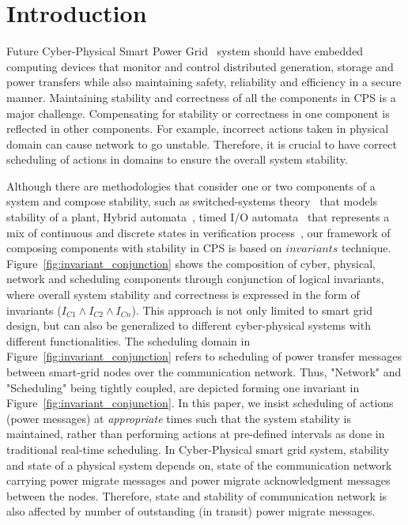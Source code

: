 \section{Introduction}
\label{sec:introduction}

Future Cyber-Physical Smart Power Grid~\cite{huang11} system should have embedded computing devices that monitor and control distributed generation, storage and power transfers while also maintaining safety, reliability and efficiency in a secure manner. Maintaining stability and correctness of all the components in CPS is a major challenge. Compensating for stability or correctness in one component is reflected in other components. For example, incorrect actions taken in physical domain can cause network to go unstable. Therefore, it is crucial to have correct scheduling of actions in domains to ensure the overall system stability.

Although there are methodologies that consider one or two components of a system and compose stability, such as switched-systems theory~\cite{donkers11} that models stability of a plant, Hybrid automata~\cite{henzinger96}, timed I/O automata~\cite{alur94} that represents a mix of continuous and discrete states in verification process~\cite{chutinan03,tomlin03}, our framework of composing components with stability in CPS is based on $invariants$ technique. Figure~\ref{fig:invariant_conjunction} shows the composition of cyber, physical, network and scheduling components through conjunction of logical invariants, where overall system stability and correctness is expressed in the form of invariants ($I_{C1} \wedge I_{C2} \wedge I_{Cn}$). This approach is not only limited to smart grid design, but can also be generalized to different cyber-physical systems with different functionalities. The scheduling domain in Figure~\ref{fig:invariant_conjunction} refers to scheduling of power transfer messages between smart-grid nodes over the communication network. Thus, "Network" and "Scheduling" being tightly coupled, are depicted forming one invariant in Figure~\ref{fig:invariant_conjunction}. In this paper, we insist scheduling of actions (power messages) at \textit{appropriate} times such that the system stability is maintained, rather than performing actions at pre-defined intervals as done in traditional real-time scheduling. In Cyber-Physical smart grid system, stability and state of a physical system depends on, state of the communication network carrying power migrate messages and power migrate acknowledgment messages between the nodes. Therefore, state and stability of communication network is also affected by number of outstanding (in transit) power migrate messages.

